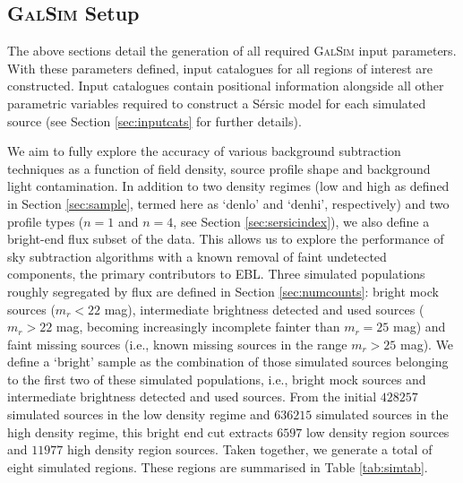 \documentclass[fleqn,usenatbib,useAMS]{mnras}
\newcommand*{\Sersic}{S\'{e}rsic\xspace}
\newcommand*{\GalSim}{\textsc{GalSim}\xspace}
\begin{document}
\subsection{\GalSim Setup}
\label{sec:galsimsetup}

The above sections detail the generation of all required \GalSim input parameters. With these parameters defined, input catalogues for all regions of interest are constructed. Input catalogues contain positional information alongside all other parametric variables required to construct a \Sersic model for each simulated source (see Section \ref{sec:inputcats} for further details).

We aim to fully explore the accuracy of various background subtraction techniques as a function of field density, source profile shape and background light contamination. In addition to two density regimes (low and high as defined in Section \ref{sec:sample}, termed here as `denlo' and `denhi', respectively) and two profile types ($n=1$ and $n=4$, see Section \ref{sec:sersicindex}), we also define a bright-end flux subset of the data. This allows us to explore the performance of sky subtraction algorithms with a known removal of faint undetected components, the primary contributors to EBL. Three simulated populations roughly segregated by flux are defined in Section \ref{sec:numcounts}: bright mock sources ($m_r<22$ mag), intermediate brightness detected and used sources ($m_r>22$ mag, becoming increasingly incomplete fainter than $m_r=25$ mag) and faint missing sources (i.e., known missing sources in the range $m_r>25$ mag). We define a `bright' sample as the combination of those simulated sources belonging to the first two of these simulated populations, i.e., bright mock sources and intermediate brightness detected and used sources. From the initial $428257$ simulated sources in the low density regime and $636215$ simulated sources in the high density regime, this bright end cut extracts $6597$ low density region sources and $11977$ high density region sources. Taken together, we generate a total of eight simulated regions. These regions are summarised in Table \ref{tab:simtab}.
\end{document}
